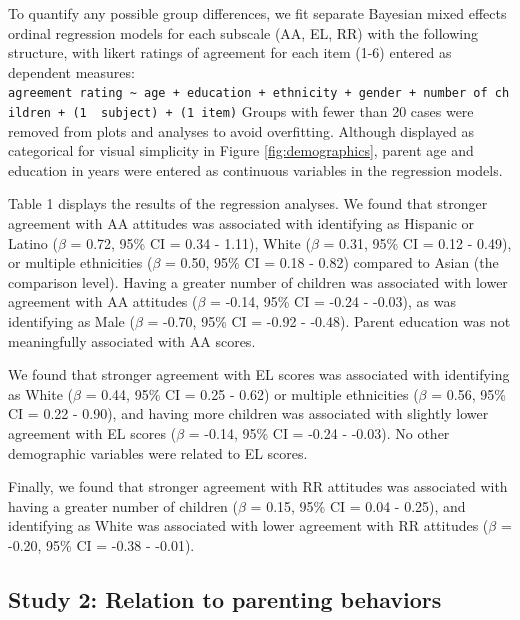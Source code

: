 \documentclass[man]{apa6}
\theoremstyle{definition}
\theoremstyle{definition}
\theoremstyle{definition}
\theoremstyle{remark}
\begin{document}
To quantify any possible group differences, we fit separate Bayesian
mixed effects ordinal regression models for each subscale (AA, EL, RR)
with the following structure, with likert ratings of agreement for each
item (1-6) entered as dependent measures:
\texttt{agreement\ rating\ \textasciitilde{}\ age\ +\ education\ +\ ethnicity\ +\ gender\ +\ number\ of\ children\ +\ (1\ \textbar{}\ subject)\ +\ (1\textbar{}\ item)}
Groups with fewer than 20 cases were removed from plots and analyses to
avoid overfitting. Although displayed as categorical for visual
simplicity in Figure \ref{fig:demographics}, parent age and education in
years were entered as continuous variables in the regression models.

Table 1 displays the results of the regression analyses. We found that
stronger agreement with AA attitudes was associated with identifying as
Hispanic or Latino (\(\beta\) = 0.72, 95\% CI = 0.34 - 1.11), White
(\(\beta\) = 0.31, 95\% CI = 0.12 - 0.49), or multiple ethnicities
(\(\beta\) = 0.50, 95\% CI = 0.18 - 0.82) compared to Asian (the
comparison level). Having a greater number of children was associated
with lower agreement with AA attitudes (\(\beta\) = -0.14, 95\% CI =
-0.24 - -0.03), as was identifying as Male (\(\beta\) = -0.70, 95\% CI =
-0.92 - -0.48). Parent education was not meaningfully associated with AA
scores.

We found that stronger agreement with EL scores was associated with
identifying as White (\(\beta\) = 0.44, 95\% CI = 0.25 - 0.62) or
multiple ethnicities (\(\beta\) = 0.56, 95\% CI = 0.22 - 0.90), and
having more children was associated with slightly lower agreement with
EL scores (\(\beta\) = -0.14, 95\% CI = -0.24 - -0.03). No other
demographic variables were related to EL scores.

Finally, we found that stronger agreement with RR attitudes was
associated with having a greater number of children (\(\beta\) = 0.15,
95\% CI = 0.04 - 0.25), and identifying as White was associated with
lower agreement with RR attitudes (\(\beta\) = -0.20, 95\% CI = -0.38 -
-0.01).

\subsection{Study 2: Relation to parenting
behaviors}\label{study-2-relation-to-parenting-behaviors}
\end{document}
